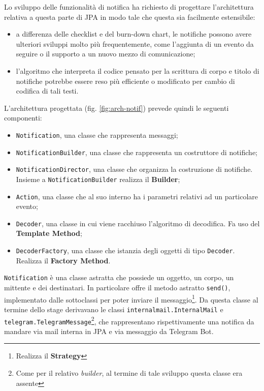 Lo sviluppo delle funzionalità di notifica ha richiesto di progettare
l'architettura relativa a questa parte di JPA in modo tale che questa sia
facilmente estensibile:

\begin{itemize}
\item a differenza delle checklist e del burn-down chart, le notifiche possono
  avere ulteriori sviluppi molto più frequentemente, come l'aggiunta di un
  evento da seguire o il supporto a un nuovo mezzo di comunicazione;
\item l'algoritmo che interpreta il codice pensato per la scrittura di corpo e
  titolo di notifiche potrebbe essere reso più efficiente o modificato per
  cambio di codifica di tali testi.
\end{itemize}

L'architettura progettata (fig. \ref{fig:arch-notif}) prevede quindi le
seguenti componenti:

\begin{itemize}
\item \texttt{Notification}, una classe che rappresenta messaggi;
\item \texttt{NotificationBuilder}, una classe che rappresenta un costruttore
  di notifiche;
\item \texttt{NotificationDirector}, una classe che organizza la costruzione
  di notifiche. Insieme a \texttt{NotificationBuilder} realizza il
   \textbf{Builder};
\item \texttt{Action}, una classe che al suo interno ha i parametri relativi
  ad un particolare evento;
\item \texttt{Decoder}, una classe in cui viene racchiuso l'algoritmo di
  decodifica. Fa uso del  \textbf{Template Method};
\item \texttt{DecoderFactory}, una classe che istanzia degli oggetti di tipo
  \texttt{Decoder}. Realizza il  \textbf{Factory Method}.
\end{itemize}

\texttt{Notification} è una classe astratta che possiede un oggetto, un corpo,
un mittente e dei destinatari. In particolare offre il metodo astratto
\texttt{send()}, implementato dalle sottoclassi per poter inviare il
messaggio\footnote{Realizza il  \textbf{Strategy}}. Da
questa classe al termine dello stage derivavano le classi
\texttt{internalmail.InternalMail} e
\texttt{telegram.TelegramMessage}\footnote{Come per il relativo
\emph{builder}, al termine di tale sviluppo questa classe era assente}, che
rappresentano rispettivamente una notifica da mandare via mail interna in JPA
e via messaggio da Telegram Bot.


